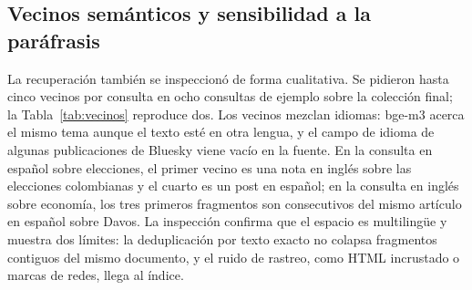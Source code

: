 \subsection{Vecinos sem\'anticos y sensibilidad a la par\'afrasis}

La recuperaci\'on tambi\'en se inspeccion\'o de forma cualitativa. Se pidieron hasta cinco vecinos por consulta en ocho consultas de ejemplo sobre la colecci\'on final; la Tabla~\ref{tab:vecinos} reproduce dos. Los vecinos mezclan idiomas: bge-m3 acerca el mismo tema aunque el texto est\'e en otra lengua, y el campo de idioma de algunas publicaciones de Bluesky viene vac\'io en la fuente. En la consulta en espa\~nol sobre elecciones, el primer vecino es una nota en ingl\'es sobre las elecciones colombianas y el cuarto es un post en espa\~nol; en la consulta en ingl\'es sobre econom\'ia, los tres primeros fragmentos son consecutivos del mismo art\'iculo en espa\~nol sobre Davos. La inspecci\'on confirma que el espacio es multiling\"ue y muestra dos l\'imites: la deduplicaci\'on por texto exacto no colapsa fragmentos contiguos del mismo documento, y el ruido de rastreo, como HTML incrustado o marcas de redes, llega al \'indice.

